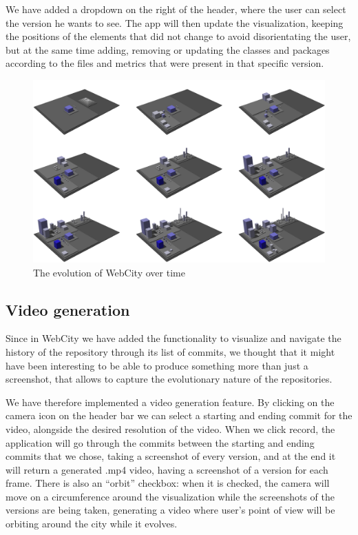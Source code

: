 \documentclass[]{usiinfbachelorproject}
\begin{document}
 We have added a dropdown on the right of the header, where the user can select the version he wants to see. The app will then update the visualization,  keeping the positions of the elements that did not change to avoid disorientating the user, but at the same time adding, removing or updating the classes and packages according to the files and metrics that were present in that specific version.

 \begin{figure} [H]
 \centering
 \includegraphics[width=1\textwidth]{pictures/evolution.png}
 \caption{The evolution of WebCity over time}
 \label{fig:evolutionq}
 \end{figure}

\pagebreak

\subsection{Video generation} \label{Video generation}
Since in WebCity we have added the functionality to visualize and navigate the history of the repository through its list of commits, we thought that it might have been interesting to be able to produce something more than just a screenshot, that allows to capture the evolutionary nature of the repositories.

We have therefore implemented a video generation feature. By clicking on the camera icon on the header bar we can select a starting and ending commit for the video, alongside the desired resolution of the video. When we click record, the application will go through the commits between the starting and ending commits that we chose, taking a screenshot of every version, and at the end it will return a generated .mp4 video, having a screenshot of a version for each frame.
There is also an ``orbit'' checkbox: when it is checked, the camera will move on a circumference around the visualization while the screenshots of the versions are being taken, generating a video where user's point of view will be orbiting around the city while it evolves.
\end{document}

